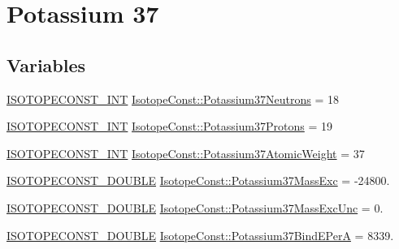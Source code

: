 \hypertarget{group___isotope_const-_potassium-_k37}{}\section{Potassium 37}
\label{group___isotope_const-_potassium-_k37}
\subsection*{Variables}
\begin{DoxyCompactItemize}
\item 
\mbox{\hyperlink{group___isotope_const-_macros_ga5f18360b3e99483a35c32d789e62621c}{I\+S\+O\+T\+O\+P\+E\+C\+O\+N\+S\+T\+\_\+\+I\+NT}} \mbox{\hyperlink{group___isotope_const-_potassium-_k37_ga3f5e36ce93ca88d6e8cc5360aed08a33}{Isotope\+Const\+::\+Potassium37\+Neutrons}} = 18
\item 
\mbox{\hyperlink{group___isotope_const-_macros_ga5f18360b3e99483a35c32d789e62621c}{I\+S\+O\+T\+O\+P\+E\+C\+O\+N\+S\+T\+\_\+\+I\+NT}} \mbox{\hyperlink{group___isotope_const-_potassium-_k37_ga185dc5f6e62daa1b79666e6ab6a5e16b}{Isotope\+Const\+::\+Potassium37\+Protons}} = 19
\item 
\mbox{\hyperlink{group___isotope_const-_macros_ga5f18360b3e99483a35c32d789e62621c}{I\+S\+O\+T\+O\+P\+E\+C\+O\+N\+S\+T\+\_\+\+I\+NT}} \mbox{\hyperlink{group___isotope_const-_potassium-_k37_ga3f0f3f1f4e4e08776a03d5bb2138336f}{Isotope\+Const\+::\+Potassium37\+Atomic\+Weight}} = 37
\item 
\mbox{\hyperlink{group___isotope_const-_macros_ga8f45a7272ce02c0b4c65c44636ed719a}{I\+S\+O\+T\+O\+P\+E\+C\+O\+N\+S\+T\+\_\+\+D\+O\+U\+B\+LE}} \mbox{\hyperlink{group___isotope_const-_potassium-_k37_gad7b27d4ca6c460fb8b2f500e5459606a}{Isotope\+Const\+::\+Potassium37\+Mass\+Exc}} = -\/24800.
\item 
\mbox{\hyperlink{group___isotope_const-_macros_ga8f45a7272ce02c0b4c65c44636ed719a}{I\+S\+O\+T\+O\+P\+E\+C\+O\+N\+S\+T\+\_\+\+D\+O\+U\+B\+LE}} \mbox{\hyperlink{group___isotope_const-_potassium-_k37_gae2c27e9384606f44ac5d7033abc67cab}{Isotope\+Const\+::\+Potassium37\+Mass\+Exc\+Unc}} = 0.
\item 
\mbox{\hyperlink{group___isotope_const-_macros_ga8f45a7272ce02c0b4c65c44636ed719a}{I\+S\+O\+T\+O\+P\+E\+C\+O\+N\+S\+T\+\_\+\+D\+O\+U\+B\+LE}} \mbox{\hyperlink{group___isotope_const-_potassium-_k37_ga1ef753afca142b4488b1e0790cf382a9}{Isotope\+Const\+::\+Potassium37\+Bind\+E\+PerA}} = 8339.
\item 

\end{DoxyCompactItemize}
